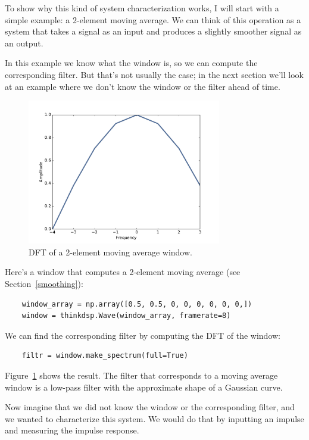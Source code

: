 \documentclass[12pt]{book}
\begin{document}
To show why this kind of system characterization works, I
will start with a simple example: a 2-element moving average.
We can think of this operation as a system that takes a signal
as an input and produces a slightly smoother signal as an output.

In this example we know what the window is, so we can compute
the corresponding filter.  But that's not usually the case; in the
next section we'll look at an example where we don't know the
window or the filter ahead of time.

\begin{figure}
\centerline{\includegraphics[height=2.5in]{figs/systems1.pdf}}
\caption{DFT of a 2-element moving average window.}
\label{fig.systems1}
\end{figure}

Here's a window that computes a
2-element moving average (see Section~\ref{smoothing}):

\begin{verbatim}
    window_array = np.array([0.5, 0.5, 0, 0, 0, 0, 0, 0,])
    window = thinkdsp.Wave(window_array, framerate=8)
\end{verbatim}

We can find the corresponding filter by computing the DFT of the
window:

\begin{verbatim}
    filtr = window.make_spectrum(full=True)
\end{verbatim}

Figure~\ref{fig.systems1} shows the result.  The filter that corresponds to a
moving average window is a low-pass filter with the approximate shape
of a Gaussian curve.

Now imagine that we did not know the window or the corresponding filter,
and we wanted to characterize this system.  We would do that by
inputting an impulse and measuring the impulse response.
\end{document}
